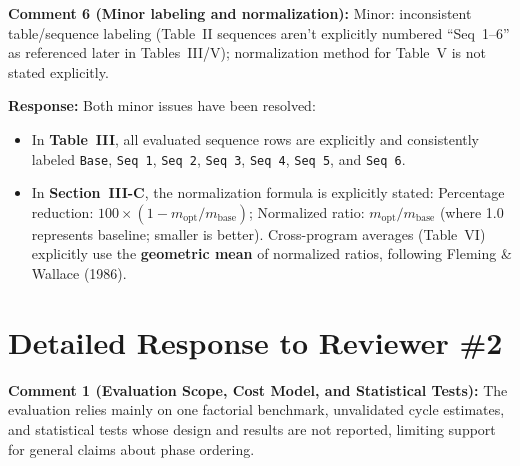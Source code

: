 \documentclass[10pt,a4paper]{article}
\begin{document}
\vspace{0.8em}
\begin{reviewercomment}
\textbf{Comment 6 (Minor labeling and normalization):} Minor: inconsistent table/sequence labeling (Table~II sequences aren't explicitly numbered ``Seq~1--6'' as referenced later in Tables~III/V); normalization method for Table~V is not stated explicitly.
\end{reviewercomment}

\noindent \textbf{Response:} Both minor issues have been resolved:
\begin{itemize}[itemsep=1pt,parsep=0pt,topsep=2pt]
    \item In \textbf{Table~III}, all evaluated sequence rows are explicitly and consistently labeled \texttt{Base}, \texttt{Seq 1}, \texttt{Seq 2}, \texttt{Seq 3}, \texttt{Seq 4}, \texttt{Seq 5}, and \texttt{Seq 6}.
    \item In \textbf{Section~III-C}, the normalization formula is explicitly stated:
    Percentage reduction: $100 \times (1 - m_{\mathrm{opt}} / m_{\mathrm{base}})$;
    Normalized ratio: $m_{\mathrm{opt}} / m_{\mathrm{base}}$ (where 1.0 represents baseline; smaller is better).
    Cross-program averages (Table~VI) explicitly use the \textbf{geometric mean} of normalized ratios, following Fleming \& Wallace (1986).
\end{itemize}

\vspace{1em}
\section*{Detailed Response to Reviewer \#2}

\begin{reviewercomment}
\textbf{Comment 1 (Evaluation Scope, Cost Model, and Statistical Tests):} The evaluation relies mainly on one factorial benchmark, unvalidated cycle estimates, and statistical tests whose design and results are not reported, limiting support for general claims about phase ordering.
\end{reviewercomment}
\end{document}
